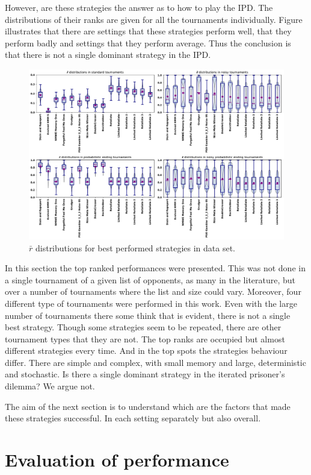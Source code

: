 \documentclass{article}
\begin{document}
However, are these strategies the answer as to how to play the IPD. The distributions
of their ranks are given for all the tournaments individually. Figure illustrates
that there are settings that these strategies perform well, that they perform
badly and settings that they perform average. Thus the conclusion is that there
is not a single dominant strategy in the IPD.


\begin{figure}[!htbp]
    \centering
    \includegraphics[width=.8\textwidth]{../images/performance.pdf}
    \caption{\(\bar{r}\) distributions for best performed strategies in data set.}
    \label{fig:overall_results}
\end{figure}


In this section the top ranked performances were presented. This was not done in
a single tournament of a given list of opponents, as many in the literature, but
over a number of tournaments where the list and size could vary. Moreover, four
different type of tournaments were performed in this work. Even with the large
number of tournaments there some think that is evident, there is not a single
best strategy. Though some strategies seem to be repeated, there are other
tournament types that they are not. The top ranks are occupied but almost
different strategies every time. And in the top spots the strategies behaviour
differ. There are simple and complex, with small memory and large, deterministic
and stochastic. Is there a single dominant strategy in the iterated prisoner's
dilemma? We argue not.

The aim of the next section is to understand which are the factors that made
these strategies successful. In each setting separately but also overall.

\section{Evaluation of performance}\label{section:evaluation_of_performance}
\end{document}
